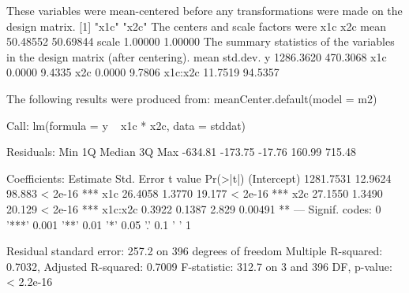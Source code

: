 \begin{Schunk}
\begin{Soutput}
These variables were mean-centered before any transformations were made on the design matrix.
[1] "x1c" "x2c"
The centers and scale factors were 
           x1c      x2c
mean  50.48552 50.69844
scale  1.00000  1.00000
The summary statistics of the variables in the design matrix (after centering). 
             mean std.dev.
y       1286.3620 470.3068
x1c        0.0000   9.4335
x2c        0.0000   9.7806
x1c:x2c   11.7519  94.5357

The following results were produced from: 
meanCenter.default(model = m2)

Call:
lm(formula = y ~ x1c * x2c, data = stddat)

Residuals:
    Min      1Q  Median      3Q     Max 
-634.81 -173.75  -17.76  160.99  715.48 

Coefficients:
             Estimate Std. Error t value Pr(>|t|)    
(Intercept) 1281.7531    12.9624  98.883  < 2e-16 ***
x1c           26.4058     1.3770  19.177  < 2e-16 ***
x2c           27.1550     1.3490  20.129  < 2e-16 ***
x1c:x2c        0.3922     0.1387   2.829  0.00491 ** 
---
Signif. codes:  0 '***' 0.001 '**' 0.01 '*' 0.05 '.' 0.1 ' ' 1

Residual standard error: 257.2 on 396 degrees of freedom
Multiple R-squared:  0.7032,	Adjusted R-squared:  0.7009 
F-statistic: 312.7 on 3 and 396 DF,  p-value: < 2.2e-16
\end{Soutput}
\end{Schunk}
